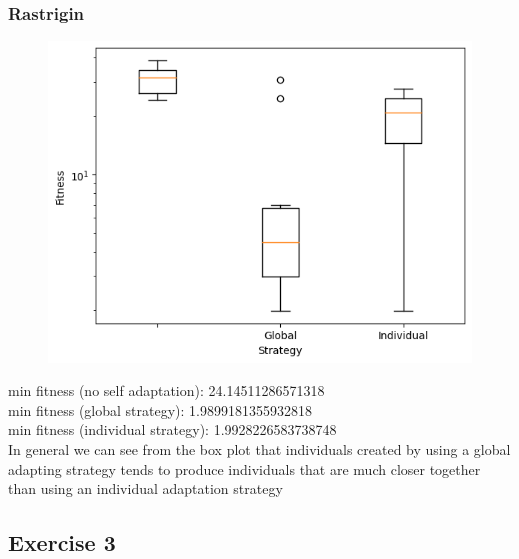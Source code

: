 \subsubsection{Rastrigin}
\begin{figure}[H]
    \centering
    \includegraphics[width=\linewidth]{images/lab3/ras_strat.png}
\end{figure}
min fitness (no self adaptation): 24.14511286571318 \\
min fitness (global strategy): 1.9899181355932818 \\
min fitness (individual strategy): 1.9928226583738748 \\

\noindent In general we can see from the box plot that individuals created by using a global adapting strategy tends to produce individuals that are much closer together than using an individual adaptation strategy

\subsection{Exercise 3}
